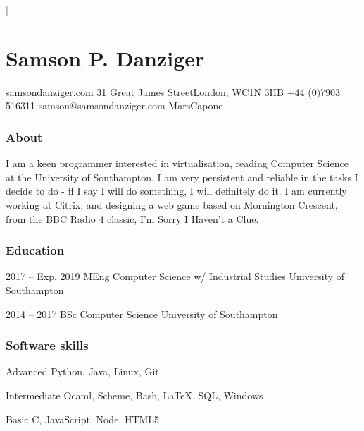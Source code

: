 \documentclass{tccv}
\begin{document}
\twocolumn[

\part{Samson P. Danziger}

\begin{multicols}{2}
    \personal
        {samsondanziger.com}
        {31 Great James Street\newline London, WC1N 3HB}
        {+44 (0)7903 516311}
        {samson@samsondanziger.com}
        {MarsCapone}

    \section{About}
        I am a keen programmer interested in virtualisation, reading Computer Science at the University of Southampton. I am very persistent and reliable in the tasks I decide to do - if I say I will do something, I will definitely do it. I am currently working at Citrix, and designing a web game based on Mornington Crescent, from the BBC Radio 4 classic, I'm Sorry I Haven't a Clue.

\end{multicols}

\hline
\bigskip

\begin{multicols}{2}
    \section{Education}

        \begin{yearlist}

        \item{2017 -- Exp. 2019}
             {MEng Computer Science \newline w/ Industrial Studies}
             {University of Southampton}

        {\item[Awarded 2:1]{2014 -- 2017}
             {BSc Computer Science}
             {University of Southampton}}

        \end{yearlist}

    \section{Software skills}

        \begin{factlist}

        \item{Advanced}
             {Python, Java, Linux, Git}

        \item{Intermediate}
             {Ocaml, Scheme, Bash, \LaTeX, SQL, Windows}

        \item{Basic}
             {C, JavaScript, Node, HTML5}

        \end{factlist}

\end{multicols}
\end{document}
